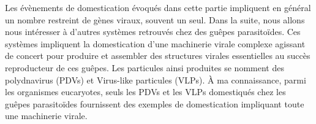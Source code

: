 Les évènements de domestication évoqués dans cette partie impliquent en général un nombre restreint de gènes viraux, souvent un seul. Dans la suite, nous allons nous intéresser à d'autres systèmes retrouvés chez des guêpes parasitoïdes. Ces systèmes impliquent la domestication d'une machinerie virale complexe agissant de concert pour produire et assembler des structures virales essentielles au succès reproducteur de ces guêpes. Les particules ainsi produites se nomment des polydnavirus (PDVs) et Virus-like particules (VLPs). À ma connaissance, parmi les organismes eucaryotes, seuls les PDVs et les VLPs domestiqués chez les guêpes parasitoïdes fournissent des exemples de domestication impliquant toute une machinerie virale.
